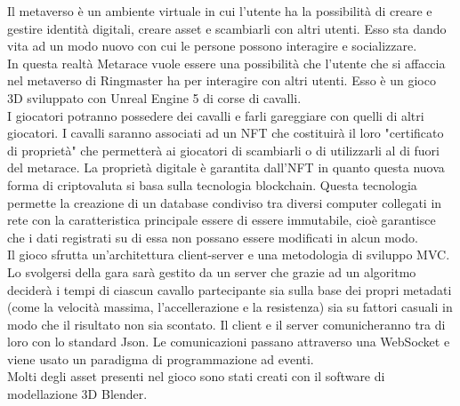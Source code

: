 Il metaverso è un ambiente virtuale in cui l'utente ha la possibilità di creare e gestire identità digitali, creare asset e scambiarli con altri utenti. Esso sta dando vita ad un modo nuovo con cui le persone possono interagire e socializzare. \\
In questa realtà Metarace vuole essere una possibilità che l'utente che si affaccia nel metaverso di Ringmaster ha per interagire con altri utenti. Esso è un gioco 3D sviluppato con Unreal Engine 5 di corse di cavalli. \\
I giocatori potranno possedere dei cavalli e farli gareggiare con quelli di altri giocatori. I cavalli saranno associati ad un NFT che costituirà il loro "certificato di proprietà" che permetterà ai giocatori di scambiarli o di utilizzarli al di fuori del metarace. 
La proprietà digitale è garantita dall'NFT in quanto questa nuova forma di criptovaluta si basa sulla tecnologia blockchain. Questa tecnologia permette la creazione di un database condiviso tra diversi computer collegati in rete con la caratteristica principale essere di essere immutabile, cioè garantisce che i dati registrati su di essa non possano essere modificati in alcun modo. \\
Il gioco sfrutta un'architettura client-server e una metodologia di sviluppo MVC. Lo svolgersi della gara sarà gestito da un server che grazie ad un algoritmo deciderà i tempi di ciascun cavallo partecipante sia sulla base dei propri metadati (come la velocità massima, l'accellerazione e la resistenza) sia su fattori casuali in modo che il risultato non sia scontato. Il client e il server comunicheranno tra di loro con lo standard Json. Le comunicazioni passano attraverso una WebSocket e viene usato un paradigma di programmazione ad eventi. \\
Molti degli asset presenti nel gioco sono stati creati con il software di modellazione 3D Blender. 